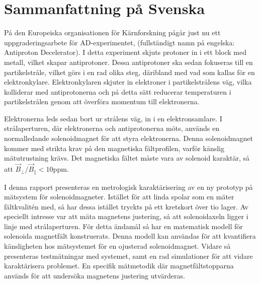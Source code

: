 \documentclass{UUThesisTemplate}
\begin{document}
\frontmatter
\frontmatterCS
\newpage
\section*{Sammanfattning på Svenska}
På den Europeiska organisationen för Kärnforskning pågår just
nu ett uppgraderingsarbete för AD-experimentet, (fullständigt
namn på engelska: Antiproton Decelerator). I detta experiment
skjuts protoner in i ett block med metall, vilket skapar 
antiprotoner. Dessa antiprotoner ska sedan fokuseras till
en partikelstråle, vilket görs i en rad olika steg, däribland
med vad som kallas för en elektronkylare. Elektronkylaren
skjuter in elektroner i partikelstrålens väg, vilka kolliderar
med antiprotonerna och på detta sätt reducerar temperaturen
i partikelstrålen genom att överföra momentum till elektronerna.

Elektronerna leds sedan bort ur strålens väg, in i en elektronsamlare.
I strålaperturen, där elektronerna och antiprotonerna möts, används
en normalledande solenoidmagnet för att styra elektronerna. Denna
solenoidmagnet kommer med strikta krav på den magnetiska fältprofilen,
varför känslig mätutrustning krävs. Det magnetiska fältet måste
vara av solenoid karaktär, så att $\vec{B}_\perp / \vec{B}_\parallel < 10$ppm.

I denna rapport presenteras en metrologisk karaktärisering av en
ny prototyp på mätsystem för solenoidmagneter. Istället för att linda spolar som en mäter
fältkvalitén med, så har dessa istället tryckts på ett kretskort över
tio lager. Av speciellt intresse var att mäta magnetens justering, så
att solenoidaxeln ligger i linje med strålaperturen. För detta ändamål
så har en matematisk modell för solenoida magnetfält konstruerats. Denna
modell kan användas för att kvantifiera känsligheten hos mätsystemet
för en ojusterad solenoidmagnet. Vidare så presenteras testmätningar
med systemet, samt en rad simulationer för att vidare karaktärisera problemet.
En specifik mätmetodik där magnetfältstopparna används för att undersöka 
magnetens justering utvärderas.


\dedication{Thanks to everyone at the TE-MSC-MM department for their warm and
inviting culture, and sharing all
their knowledge on magnetics. Thanks especially to my supervisors Carlo Petrone
and Mariano Pentella, who taught me everything you could want to know about
Italy.}
\end{document}
